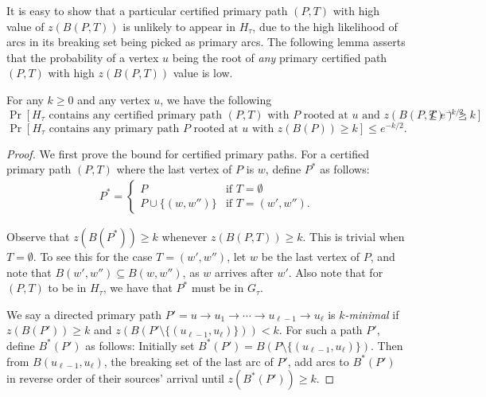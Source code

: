 It is easy to show that a particular certified primary path $(P,T)$ with high value of $z(B(P,T))$ is unlikely to appear in $H_\tau$, due to the high likelihood of arcs in its breaking set being picked as primary arcs. The following lemma asserts that the probability of a vertex $u$ being the root of \emph{any} primary certified path $(P,T)$ with high $z(B(P,T))$ value is low.
\begin{lem}\label{lem:fat}
	For any $k\geq 0$ and any vertex $u$, we have the following
	\[
	\Pr[\mbox{$H_\tau$ contains any certified primary path $(P, T)$ with $P$ rooted at $u$ and $z(B(P, T)) \geq k$}] \leq e^{-k/2},
	\]
	\[
	\Pr[\mbox{$H_\tau$ contains any primary path $P$ rooted at $u$ with $z(B(P)) \geq k$}] \leq e^{-k/2}.
	\]
\end{lem}
\begin{proof}
  We first prove the bound for certified primary paths.
  For a certified primary path $(P,T)$ where the last vertex of $P$ is $w$, define $P^\ast$ as follows:
  	\begin{align*}
	P^\ast = 	\begin{cases} P & \text{if $T = \emptyset$} \\
	  \text{$P \cup \{(w,w'')\}$} & \text{if $T = (w',w'')$}.
	\end{cases}
\end{align*}

Observe that $z(B(P^\ast)) \geq k$ whenever $z(B(P,T)) \geq k$. This is trivial when $T = \emptyset$.	
To see this for the case
 $T = (w',w'')$, let $w$ be the last vertex of $P$, and note that $B(w', w'') \subseteq B(w, w'')$, 
as $w$ arrives after $w'$.
Also note that for $(P,T)$ to be in $H_\tau$, we have that $P^\ast$ must be in $G_\tau$.
 
We say a directed primary path $P' = u \to u_1 \to \cdots \to u_{\ell - 1} \to u_\ell$ is \emph{$k$-minimal} if $z(B(P')) \geq k$ 
and $z(B(P' \setminus \{(u_{\ell - 1}, u_\ell) \})) < k$. 
For such a path $P'$, define $B^\ast(P')$ as follows: Initially set $B^\ast(P') = B(P \setminus \{(u_{\ell - 1}, u_\ell )\})$.
Then from $B(u_{\ell - 1}, u_\ell)$, the breaking set of the last arc of $P'$, add arcs to $B^\ast(P')$ in reverse order of their sources' arrival until $z(B^\ast(P')) \geq k$.


\end{proof}
